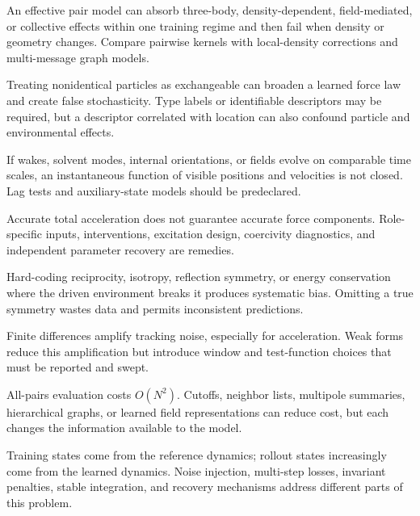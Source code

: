 \begin{description}[style=nextline]
\item[Pairwise misspecification]
An effective pair model can absorb three-body, density-dependent, field-mediated, or collective effects within one training regime and then fail when density or geometry changes. Compare pairwise kernels with local-density corrections and multi-message graph models.

\item[Hidden heterogeneity]
Treating nonidentical particles as exchangeable can broaden a learned force law and create false stochasticity. Type labels or identifiable descriptors may be required, but a descriptor correlated with location can also confound particle and environmental effects.

\item[Unobserved state and memory]
If wakes, solvent modes, internal orientations, or fields evolve on comparable time scales, an instantaneous function of visible positions and velocities is not closed. Lag tests and auxiliary-state models should be predeclared.

\item[Cancellation and non-identifiability]
Accurate total acceleration does not guarantee accurate force components. Role-specific inputs, interventions, excitation design, coercivity diagnostics, and independent parameter recovery are remedies.

\item[Symmetry mismatch]
Hard-coding reciprocity, isotropy, reflection symmetry, or energy conservation where the driven environment breaks it produces systematic bias. Omitting a true symmetry wastes data and permits inconsistent predictions.

\item[Derivative amplification]
Finite differences amplify tracking noise, especially for acceleration. Weak forms reduce this amplification but introduce window and test-function choices that must be reported and swept.

\item[Quadratic cost and long-range interactions]
All-pairs evaluation costs \(O(N^2)\). Cutoffs, neighbor lists, multipole summaries, hierarchical graphs, or learned field representations can reduce cost, but each changes the information available to the model.

\item[Rollout distribution shift]
Training states come from the reference dynamics; rollout states increasingly come from the learned dynamics. Noise injection, multi-step losses, invariant penalties, stable integration, and recovery mechanisms address different parts of this problem.
\end{description}

